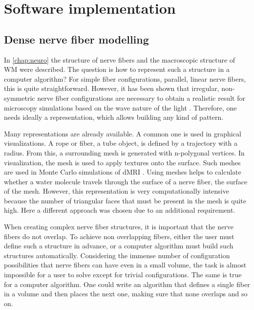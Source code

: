 \newpage\null\thispagestyle{empty}\newpage
\clearpage{\thispagestyle{empty}\cleardoublepage}
\part{Software implementation}
\parttoc
% 
% 
% 
\setcounter{chapter}{4}
\chapter{Dense nerve fiber modelling}
\label{chap:sof:modelling}
% 
In \cref{chap:neuro} the structure of nerve fibers and the macroscopic structure of \ac{WM} were described.
The question is how to represent such a structure in a computer algorithm?
For simple fiber configurations, \eg{} parallel, linear nerve fibers, this is quite straightforward.
However, it has been shown that irregular, non-symmetric nerve fiber configurations are necessary to obtain a realistic result for microscopy simulations based on the wave nature of the light \cite{MenzelDissertation}.
Therefore, one needs ideally a representation, which allows building any kind of pattern.
\par
%
Many representations are already available.
A common one is used in graphical visualizations.
A rope or fiber, \ie{} a tube object, is defined by a trajectory with a radius.
From this, a surrounding mesh is generated with n-polygonal vertices.
In visualization, the mesh is used to apply textures onto the surface.
Such meshes are \eg{} used in Monte Carlo simulations of \ac{dMRI} \cite{Ginsburger2019,ginsburgerDis2019}.
Using meshes helps to calculate whether a water molecule travels through the surface of a nerve fiber, \ie{} the surface of the mesh.
However, this representation is very computationally intensive because the number of triangular faces that must be present in the mesh is quite high.
Here a different approach was chosen due to an additional requirement.
\par
%
When creating complex nerve fiber structures, it is important that the nerve fibers do not overlap.
To achieve non overlapping fibers, either the user must define such a structure in advance, or a computer algorithm must build such structures automatically.
Considering the immense number of configuration possibilities that nerve fibers can have even in a small volume, the task is almost impossible for a user to solve except for trivial configurations.
The same is true for a computer algorithm.
One could write an algorithm that defines a single fiber in a volume and then places the next one, making sure that none overlaps and so on.

